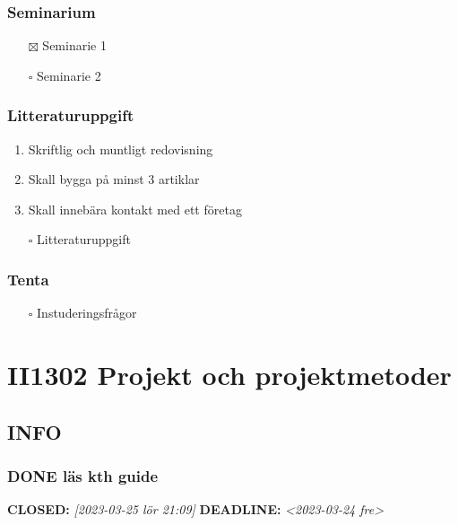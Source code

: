 \documentclass[11pt]{article}
\begin{document}
\subsubsection{Seminarium}
\label{sec:org597af82}
\begin{itemize}
\item[{$\boxtimes$}] Seminarie 1
\item[{$\square$}] Seminarie 2
\end{itemize}

\subsubsection{Litteraturuppgift}
\label{sec:org32501e5}
\begin{enumerate}
\item Skriftlig och muntligt redovisning
\item Skall bygga på minst 3 artiklar
\item Skall innebära kontakt med ett företag
\end{enumerate}


\begin{itemize}
\item[{$\square$}] Litteraturuppgift
\end{itemize}


\subsubsection{Tenta}
\label{sec:orgaa47c01}
\begin{itemize}
\item[{$\square$}] Instuderingsfrågor
\end{itemize}

\section{II1302 Projekt och projektmetoder}
\label{sec:org72ce37e}
\subsection{INFO}
\label{sec:org99fc2ea}
\subsubsection{{\bfseries\sffamily DONE} läs kth guide}
\label{sec:org6b47446}
\noindent\textbf{CLOSED:} \textit{[2023-03-25 lör 21:09] } \textbf{DEADLINE:} \textit{<2023-03-24 fre>}\\[0pt]
\end{document}
